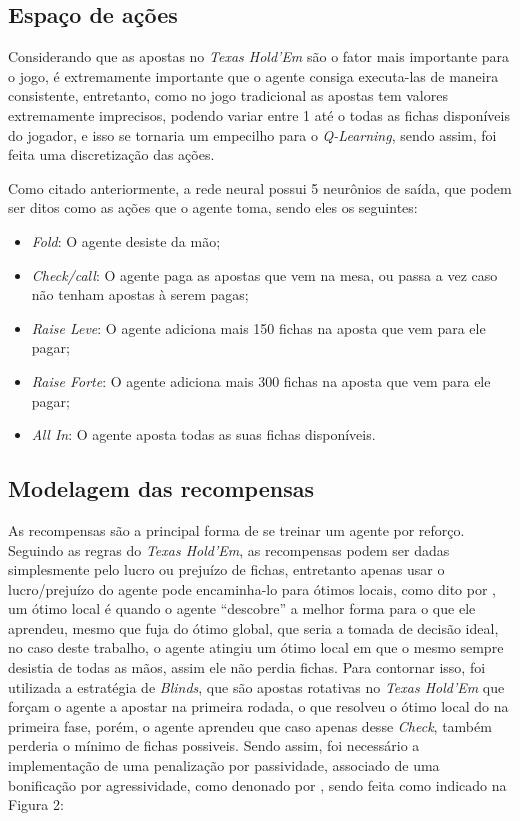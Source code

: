 \subsection{Espaço de ações}

Considerando que as apostas no \textit{Texas Hold'Em} são o fator mais importante para o jogo, é extremamente importante que o agente consiga executa-las de maneira consistente, entretanto, como no jogo tradicional as apostas tem valores extremamente imprecisos, podendo variar entre 1 até o todas as fichas disponíveis do jogador, e isso se tornaria um empecilho para o \textit{Q-Learning}, sendo assim, foi feita uma discretização das ações.

Como citado anteriormente, a rede neural possui 5 neurônios de saída, que podem ser ditos como as ações que o agente toma, sendo eles os seguintes:
\begin{itemize}
    \item \textit{Fold}: O agente desiste da mão;
    \item \textit{Check/call}: O agente paga as apostas que vem na mesa, ou passa a vez caso não tenham apostas à serem pagas;
    \item \textit{Raise Leve}: O agente adiciona mais 150 fichas na aposta que vem para ele pagar;
    \item \textit{Raise Forte}: O agente adiciona mais 300 fichas na aposta que vem para ele pagar;
    \item \textit{All In}: O agente aposta todas as suas fichas disponíveis.
\end{itemize}

\subsection{Modelagem das recompensas}

As recompensas são a principal forma de se treinar um agente por reforço. Seguindo as regras do \textit{Texas Hold'Em}, as recompensas podem ser dadas simplesmente pelo lucro ou prejuízo de fichas, entretanto apenas usar o lucro/prejuízo do agente pode encaminha-lo para ótimos locais, como dito por , um ótimo local é quando o agente ``descobre'' a melhor forma para o que ele aprendeu, mesmo que fuja do ótimo global, que seria a tomada de decisão ideal, no caso deste trabalho, o agente atingiu um ótimo local em que o mesmo sempre desistia de todas as mãos, assim ele não perdia fichas. Para contornar isso, foi utilizada a estratégia de \textit{Blinds}, que são apostas rotativas no \textit{Texas Hold'Em} que forçam o agente a apostar na primeira rodada, o que resolveu o ótimo local do  na primeira fase, porém, o agente aprendeu que caso apenas desse \textit{Check}, também perderia o mínimo de fichas possiveis. Sendo assim, foi necessário a implementação de uma penalização por passividade, associado de uma bonificação por agressividade, como denonado por , sendo feita como indicado na Figura 2:

